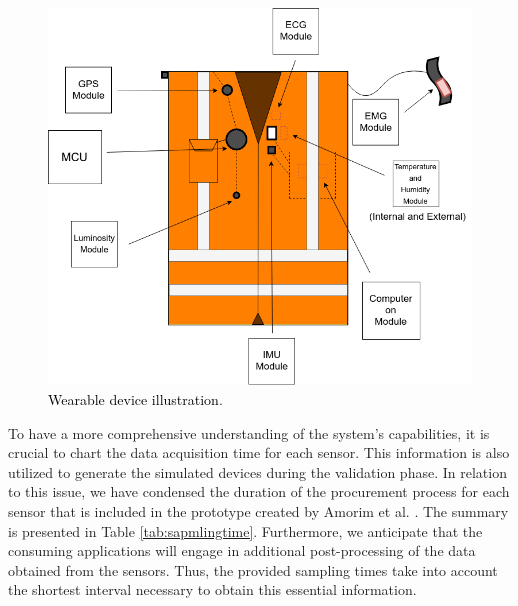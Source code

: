 \begin{figure}[h!]
    \centering
    \includegraphics[width = .6\linewidth]{Figures/vest.png}
    \caption{\textcolor{black}{Wearable device illustration}.}
    \label{fig:vest_illustration}
\end{figure}

To have a more comprehensive understanding of the system's capabilities, it is crucial to chart the data acquisition time for each sensor. This information is also utilized to generate the simulated devices during the validation phase. In relation to this issue, we have condensed the duration of the procurement process for each sensor that is included in the prototype created by Amorim et al. \cite{jp2019software}. The summary is presented in Table \ref{tab:sapmlingtime}. Furthermore, we anticipate that the consuming applications will engage in additional post-processing of the data obtained from the sensors. Thus, the provided sampling times take into account the shortest interval necessary to obtain this essential information.

\begin{table}[h!]
\caption{\label{tab:sapmlingtime} Sampling time ratio for each sensor.}
\end{table}

